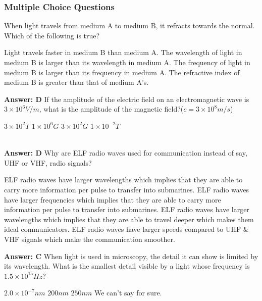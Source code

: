 \documentclass[12pt,addpoints]{exam}
\begin{document}
{{{				\subsubsection*{Multiple Choice Questions}
				\begin{questions}
					\question When light travels from medium A to medium B, it refracts towards the normal. Which of the following is true?
					\begin{choices}
						\choice Light travels faster in medium B than medium A.
						\choice The wavelength of light in medium B is larger than its wavelength in medium A.
						\choice The frequency of light in medium B is larger than its frequency in medium A.
						\choice The refractive index of medium B is greater than that of medium A's.
					\end{choices}
					\textbf{Answer: D}
					\question If the amplitude of the electric field on an electromagnetic wave is $3\times10^{6}V/m$, what is the amplitude of the magnetic field?($c=3\times10^{8}m/s$) \\
					\begin{oneparchoices}
						\choice $3\times10^2T$
						\choice $1\times10^6G$
						\choice $3\times10^{2}G$
						\choice $1\times10^{-2}T$	
					\end{oneparchoices}
					\\ \textbf{Answer: D}	
					\question Why are ELF radio waves used for communication instead of say, UHF or VHF, radio signals?
					\begin{choices}
						\choice ELF radio waves have larger wavelengths which implies that they are able to carry more information per pulse to transfer into submarines.
						\choice ELF radio waves have larger frequencies which implies that they are able to carry more information per pulse to transfer into submarines.
						\choice ELF radio waves have larger wavelengths which implies that they are able to travel deeper which makes them ideal communicators.
						\choice ELF radio waves have larger speeds compared to UHF \& VHF signals which make the communication smoother.
					\end{choices}
					\textbf{Answer: C}
					\question When light is used in microscopy, the detail it can show is limited by its wavelength. What is the smallest detail visible by a light whose frequency is $1.5\times10^{15}Hz$? \\
					\begin{oneparchoices}
						\choice $2.0\times10^{-7}nm$
						\choice $200nm$
						\choice $250nm$
						\choice We can't say for sure.

\end{oneparchoices}
\end{questions}}}}
\end{document}
